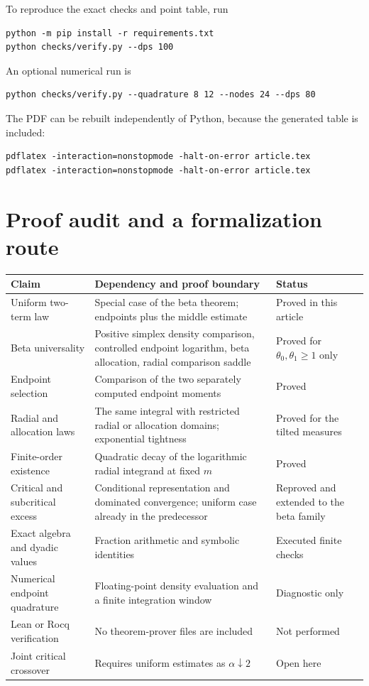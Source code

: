 \documentclass[11pt,a4paper]{article}
\numberwithin{equation}{section}
\theoremstyle{definition}\newaliascnt{definition}{theorem}
\theoremstyle{remark}\newaliascnt{remark}{theorem}
\begin{document}
To reproduce the exact checks and point table, run
\begin{verbatim}
python -m pip install -r requirements.txt
python checks/verify.py --dps 100
\end{verbatim}
An optional numerical run is
\begin{verbatim}
python checks/verify.py --quadrature 8 12 --nodes 24 --dps 80
\end{verbatim}
The PDF can be rebuilt independently of Python, because the generated table
is included:
\begin{verbatim}
pdflatex -interaction=nonstopmode -halt-on-error article.tex
pdflatex -interaction=nonstopmode -halt-on-error article.tex
\end{verbatim}

\section{Proof audit and a formalization route}
\label{sec:audit}
\begin{longtable}{@{}>{\raggedright\arraybackslash}p{}
 >{\raggedright\arraybackslash}p{}
 >{\raggedright\arraybackslash}p{}@{}}
\toprule
Claim&Dependency and proof boundary&Status\\\midrule
\endhead
Uniform two-term law&Special case of the beta theorem; endpoints plus the
middle estimate&Proved in this article\\
Beta universality&Positive simplex density comparison, controlled endpoint
logarithm, beta allocation, radial comparison saddle&Proved for
$\theta_0,\theta_1\ge1$ only\\
Endpoint selection&Comparison of the two separately computed endpoint
moments&Proved\\
Radial and allocation laws&The same integral with restricted radial or
allocation domains; exponential tightness&Proved for the tilted measures\\
Finite-order existence&Quadratic decay of the logarithmic radial integrand
at fixed $m$&Proved\\
Critical and subcritical excess&Conditional representation and dominated
convergence; uniform case already in the predecessor&Reproved and extended
to the beta family\\
Exact algebra and dyadic values&Fraction arithmetic and symbolic identities&Executed
finite checks\\
Numerical endpoint quadrature&Floating-point density evaluation and a finite
integration window&Diagnostic only\\
Lean or Rocq verification&No theorem-prover files are included&Not performed\\
Joint critical crossover&Requires uniform estimates as $\alpha\downarrow2$&Open here\\
\bottomrule
\end{longtable}
\end{document}
